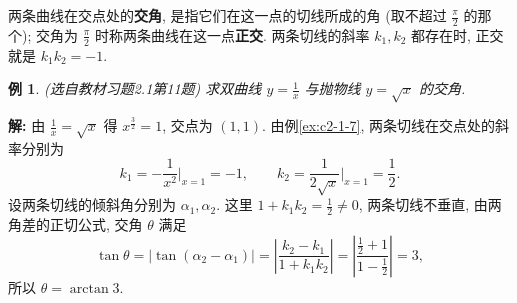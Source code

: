 \documentclass[UTF8,openany]{ctexbook}
\theoremstyle{chinesetextbook}
\newtheorem{example}{例}[section]
\newenvironment{cnsolution}{\par\indent\textbf{解:} \ignorespaces}{\par}
\begin{document}
两条曲线在交点处的\textbf{交角}, 是指它们在这一点的切线所成的角 (取不超过 $\displaystyle\frac\pi2$ 的那个); 交角为 $\displaystyle\frac\pi2$ 时称两条曲线在这一点\textbf{正交}. 两条切线的斜率 $k_1,k_2$ 都存在时, 正交就是 $k_1k_2=-1$.
\begin{example}\label{ex:c2-h1-11}
\textnormal{(选自教材习题2.1第11题)} 求双曲线 $\displaystyle y=\frac1x$ 与抛物线 $y=\sqrt x$ 的交角.
\end{example}
\begin{cnsolution}
由 $\displaystyle\frac1x=\sqrt x$ 得 $x^{\frac32}=1$, 交点为 $(1,1)$. 由例\ref{ex:c2-1-7}, 两条切线在交点处的斜率分别为
\[
k_1=-\frac1{x^2}\bigg|_{x=1}=-1,\qquad k_2=\frac1{2\sqrt x}\bigg|_{x=1}=\frac12.
\]
设两条切线的倾斜角分别为 $\alpha_1,\alpha_2$. 这里 $\displaystyle1+k_1k_2=\frac12\ne0$, 两条切线不垂直, 由两角差的正切公式, 交角 $\theta$ 满足
\[
\tan\theta=|\tan(\alpha_2-\alpha_1)|=\left|\frac{k_2-k_1}{1+k_1k_2}\right|=\left|\frac{\frac12+1}{1-\frac12}\right|=3,
\]
所以 $\theta=\arctan3$.
\end{cnsolution}
\end{document}

